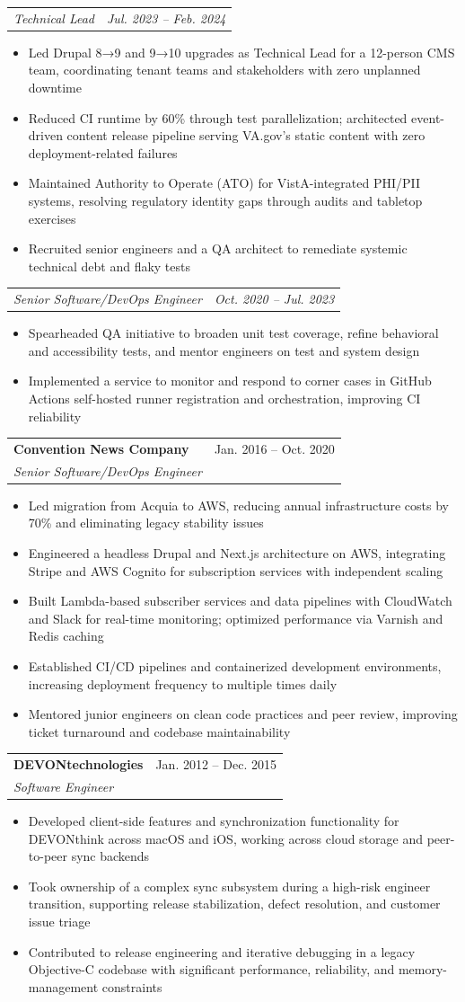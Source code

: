 \documentclass[letterpaper,11pt]{article}
\makeatletter
\newcommand{\resumeItem}[1]{
  \item\small{
    {#1 \vspace{-2pt}}
  }
}
\newcommand{\resumeSubheading}[4]{
  \vspace{-2pt}\item
    \begin{tabular*}{0.97\textwidth}[t]{l@{\extracolsep{\fill}}r}
      \textbf{#1} & #2 \\
      \textit{\small#3} & \textit{\small #4} \\
    \end{tabular*}\vspace{-7pt}
}
\newcommand{\resumeSubSubheading}[2]{
    \item
    \begin{tabular*}{0.97\textwidth}{l@{\extracolsep{\fill}}r}
      \textit{\small#1} & \textit{\small #2} \\
    \end{tabular*}\vspace{-7pt}
}
\newcommand{\resumeItemListStart}{\begin{itemize}}
\newcommand{\resumeItemListEnd}{\end{itemize}\vspace{-5pt}}
\makeatother
\begin{document}
    \resumeSubSubheading
      {Technical Lead}{Jul. 2023 – Feb. 2024}
      \resumeItemListStart
        \resumeItem{Led Drupal 8→9 and 9→10 upgrades as Technical Lead for a 12-person CMS team, coordinating tenant teams and stakeholders with zero unplanned downtime}
        \resumeItem{Reduced CI runtime by 60\% through test parallelization; architected event-driven content release pipeline serving VA.gov's static content with zero deployment-related failures}
        \resumeItem{Maintained Authority to Operate (ATO) for VistA-integrated PHI/PII systems, resolving regulatory identity gaps through audits and tabletop exercises}
        \resumeItem{Recruited senior engineers and a QA architect to remediate systemic technical debt and flaky tests}
      \resumeItemListEnd

    \resumeSubSubheading
      {Senior Software/DevOps Engineer}{Oct. 2020 – Jul. 2023}
      \resumeItemListStart
        \resumeItem{Spearheaded QA initiative to broaden unit test coverage, refine behavioral and accessibility tests, and mentor engineers on test and system design}
        \resumeItem{Implemented a service to monitor and respond to corner cases in GitHub Actions self-hosted runner registration and orchestration, improving CI reliability}
      \resumeItemListEnd

    \resumeSubheading
      {Convention News Company}{Jan. 2016 – Oct. 2020}
      {Senior Software/DevOps Engineer}{}
      \resumeItemListStart
        \resumeItem{Led migration from Acquia to AWS, reducing annual infrastructure costs by 70\% and eliminating legacy stability issues}
        \resumeItem{Engineered a headless Drupal and Next.js architecture on AWS, integrating Stripe and AWS Cognito for subscription services with independent scaling}
        \resumeItem{Built Lambda-based subscriber services and data pipelines with CloudWatch and Slack for real-time monitoring; optimized performance via Varnish and Redis caching}
        \resumeItem{Established CI/CD pipelines and containerized development environments, increasing deployment frequency to multiple times daily}
        \resumeItem{Mentored junior engineers on clean code practices and peer review, improving ticket turnaround and codebase maintainability}
      \resumeItemListEnd

    \resumeSubheading
      {DEVONtechnologies}{Jan. 2012 – Dec. 2015}
      {Software Engineer}{}
      \resumeItemListStart
        \resumeItem{Developed client-side features and synchronization functionality for DEVONthink across macOS and iOS, working across cloud storage and peer-to-peer sync backends}
        \resumeItem{Took ownership of a complex sync subsystem during a high-risk engineer transition, supporting release stabilization, defect resolution, and customer issue triage}
        \resumeItem{Contributed to release engineering and iterative debugging in a legacy Objective-C codebase with significant performance, reliability, and memory-management constraints}
      \resumeItemListEnd
\end{document}
